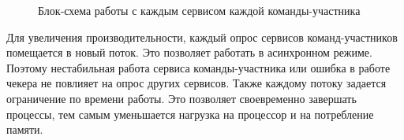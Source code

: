\begin{figure}[ht!]
\caption{Блок-схема работы с каждым сервисом каждой команды-участника}
\end{figure}
\clearpage

Для увеличения производительности, каждый опрос сервисов команд-участников помещается в новый поток. Это позволяет работать в асинхронном режиме. Поэтому нестабильная работа сервиса команды-участника или ошибка в работе чекера не повлияет на опрос других сервисов. Также каждому потоку задается ограничение по времени работы. Это позволяет своевременно завершать процессы, тем самым уменьшается нагрузка на процессор и на потребление памяти.

